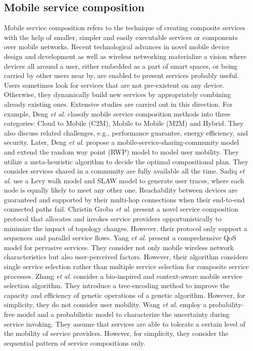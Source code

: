\documentclass[journal]{IEEEtran}
\begin{document}
\subsection{Mobile service composition}
Mobile service composition refers to the technique of creating composite services with the help of smaller, simpler and easily executable services or components over mobile networks. Recent technological advances in novel mobile device design and development as well as wireless networking materialize a vision where devices all around a user, either embedded as a part of smart spaces, or being carried by other users
near by, are enabled to present services probably useful. Users sometimes look for services that are not pre-existent on any device. Otherwise, they dynamically build new services by appropriately combining already existing ones. Extensive studies are carried out in this direction. 
For example, Deng \emph{et al}. \cite{Deng2016} classify mobile service composition methods into three categories: Cloud to Mobile (C2M), Mobile to Mobile (M2M) and Hybrid. They also discuss related challenges, e.g., performance guarantee, energy efficiency, and security.
Later, Deng \emph{et al}. \cite{Deng2017} propose a mobile-service-sharing-community model and extend the random way point (RWP) model to model user mobility. They utilize a meta-heuristic algorithm to decide the optimal compositional plan. They consider services shared in a community are fully available all the time.
Sadiq \emph{et al}. \cite{sadiq2015service} use a Levy walk model and SLAW model to generate user traces, where each node is equally likely to meet any other one. Reachability between devices are guaranteed and supported by their multi-hop connections when their end-to-end connected paths fail.
Christin Groba \emph{et al}. \cite{groba2014opportunistic} present a novel service composition protocol that allocates and invokes service providers opportunistically to minimize the impact of topology changes. However, their protocol only support a sequences and parallel service flows.
Yang \emph{et al}. \cite{Yang2010} present a comprehensive QoS model for pervasive services. They consider not only mobile wireless network characteristics but also user-perceived factors. However, their algorithm considers single service selection rather than multiple service selection for composite service processes.
Zhang \emph{et al}. \cite{Zhang2016qos} consider a bio-inspired and context-aware mobile service selection algorithm. They introduce a tree-encoding method to improve the capacity and efficiency of genetic operations of a genetic algorithm. However, for simplicity, they do not consider user mobility.
Wang \emph{et al}. \cite{wang2011exploiting} employ a probability-free model and a probabilistic model to characterize the uncertainty during service invoking. They assume that services are able to tolerate a certain level of the mobility of service providers. However, for simplicity, they consider the sequential pattern of service compositions only.
\end{document}

